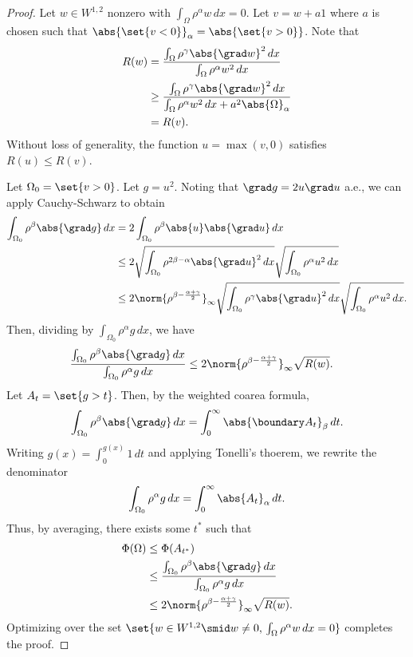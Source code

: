 \begin{proof}
Let $w\in W^{1,2}$ nonzero with $\int_\Omega \rho^\alpha w\,dx = 0$. Let $v = w+a1$ where $a$ is chosen such that $\abs{\set{v<0}}_\alpha = \abs{\set{v>0}}$. Note that
\begin{align*}
R(w) &= \frac{\int_\Omega \rho^\gamma \abs{\grad w}^2\,dx}{\int_\Omega \rho^\alpha w^2\,dx}\\
&\geq \frac{\int_\Omega \rho^\gamma \abs{\grad w}^2\,dx}{\int_\Omega \rho^\alpha w^2\,dx+ a^2\abs{\Omega}_\alpha}\\
&= R(v).
\end{align*}
Without loss of generality, the function $u = \max(v,0)$ satisfies $R(u)\leq R(v)$.

Let $\Omega_0 = \set{v>0}$. Let $g = u^2$. Noting that $\grad g = 2u\grad u$ a.e., we can apply Cauchy-Schwarz to obtain
\begin{align*}
\int_{\Omega_0}\rho^\beta \abs{\grad g}\,dx &= 2\int_{\Omega_0}\rho^\beta \abs{u}\abs{\grad u}\,dx\\
&\leq 2 \sqrt{\int_{\Omega_0} \rho^{2\beta - \alpha} \abs{\grad u}^2\,dx}\sqrt{\int_{\Omega_0} \rho^{\alpha} u^2\,dx}\\
&\leq 2 \norm{\rho^{\beta - \frac{\alpha+\gamma}{2}}}_\infty \sqrt{\int_{\Omega_0} \rho^\gamma \abs{\grad u}^2\,dx}\sqrt{\int_{\Omega_0} \rho^{\alpha} u^2\,dx}.
\end{align*}
Then, dividing by $\int_{\Omega_0} \rho^\alpha g\,dx$, we have
\begin{align*}
\frac{\int_{\Omega_0} \rho^\beta \abs{\grad g}\,dx}{\int_{\Omega_0} \rho^\alpha g\,dx} &\leq2 \norm{\rho^{\beta - \frac{\alpha+\gamma}{2}}}_\infty \sqrt{R(w)}.
\end{align*}
Let $A_t = \set{g>t}$. Then, by the weighted coarea formula,
\begin{align*}
\int_{\Omega_0} \rho^\beta \abs{\grad g}\,dx = \int_0^\infty \abs{\boundary A_t}_\beta\,dt.
\end{align*}
Writing $g(x) = \int_0^{g(x)} 1 \,dt$ and applying Tonelli's thoerem, we rewrite the denominator
\begin{align*}
\int_{\Omega_0} \rho^\alpha g\,dx = \int_{0}^\infty \abs{A_t}_\alpha\,dt.
\end{align*}
Thus, by averaging, there exists some $t^*$ such that
\begin{align*}
\Phi(\Omega) &\leq \Phi(A_{t^*})\\
&\leq \frac{\int_{\Omega_0} \rho^\beta \abs{\grad g}\,dx}{\int_{\Omega_0} \rho^\alpha g\,dx}\\
&\leq2 \norm{\rho^{\beta - \frac{\alpha+\gamma}{2}}}_\infty \sqrt{R(w)}.
\end{align*}
Optimizing over the set $\set{w\in W^{1,2}\smid w\neq 0,\,\int_\Omega \rho^\alpha w\,dx = 0}$ completes the proof.
\end{proof}

